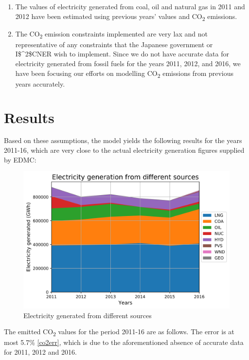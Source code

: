 \documentclass[14pt,a4paper]{article} %
\begin{document}
\begin{enumerate}
\item The values of electricity generated from coal, oil and natural gas in 2011 and 2012 have been estimated using previous years' values and CO\textsubscript{2} emissions.

\item The CO\textsubscript{2} emission constraints implemented are very lax and not representative of any constraints that the Japanese government or \gls{I$^2$CNER}  wish to implement. Since we do not have accurate data for electricity generated from fossil fuels for the years 2011, 2012, and 2016, we have been focusing our efforts on modelling CO\textsubscript{2} emissions from previous years accurately.
\end{enumerate}

\section{Results}

Based on these assumptions, the model yields the following results for the years 2011-16, which are very close to the actual electricity generation figures supplied by \gls{EDMC}:

\begin{figure}[H]
\centering
\includegraphics[scale=0.6]{elc-2016}
\caption{Electricity generated from different sources}
\end{figure}

The emitted CO\textsubscript{2} values for the period 2011-16 are as follows. The error is at most 5.7\% \ref{co2err}, which is due to the aforementioned absence of accurate data for 2011, 2012 and 2016. 
\end{document}
